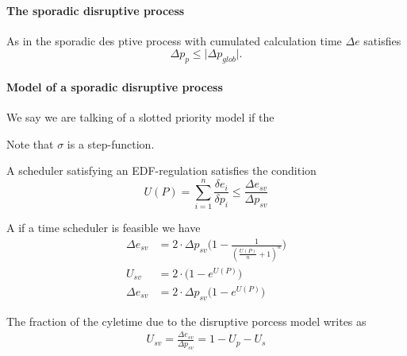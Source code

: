 \paragraph{The sporadic disruptive process}
As in \cite{K} the sporadic des
ptive process with cumulated calculation time $\Delta e$ satisfies
\begin{equation}
\Delta p_{p} \leq \lvert{\Delta p_{glob}} \rvert. 
\end{equation}


\paragraph{Model of a sporadic disruptive process}
We say we are talking of a slotted priority model if the 

\begin{remark}
Note that $\sigma$ is a step-function. 
\end{remark}


\begin{remark} A scheduler satisfying an EDF-regulation satisfies the condition
	\begin{equation}
	U(P) = \sum\limits_{i=1}^n \frac{\delta e_i}{\delta p_i} \leq 		\frac{\Delta e_{sv}}{\Delta p_{sv}}
	\end{equation}
\end{remark}

\begin{theorem}
A if a time scheduler is feasible we have
	\begin{subequations} 
	\begin{align}
	 \Delta e_{sv} &= 2 \cdot \Delta p_{sv} \Big( 1- \frac{1}{(\frac{U(P)}{
	 n}+1)^n} \Big)\\
	 U_{sv} &= 2 \cdot \Big( 1-e^{U(P)} \Big)\\
	 \Delta e_{sv} &= 2 \cdot \Delta p_{sv} \Big( 1 -e ^{U(P)} \Big) 
	\end{align}
	\end{subequations}
\end{theorem}

\begin{theorem}
The fraction of the cyletime due to the disruptive porcess model writes as 
	\begin{subequations} 
	\begin{align}
	U_{sv} = \frac{\Delta e_{sv}}{\Delta p_{sv}} = 1 - U_p - U_s
	\end{align}
	\end{subequations}
\end{theorem}

